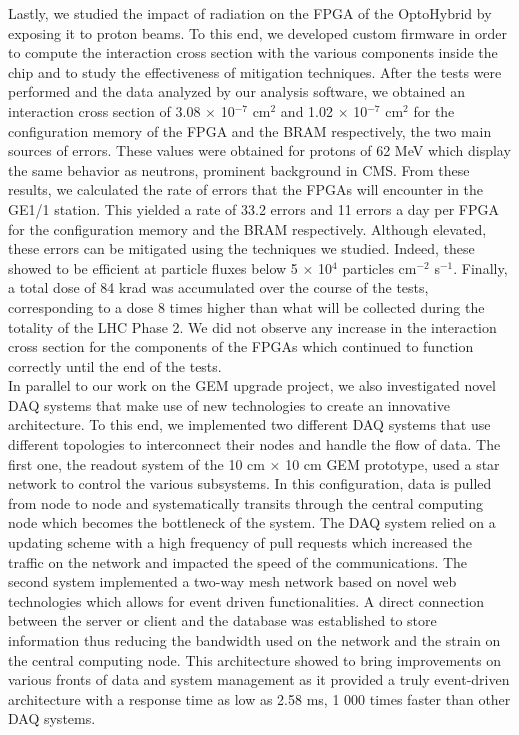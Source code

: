   Lastly, we studied the impact of radiation on the FPGA of the OptoHybrid by exposing it to proton beams. To this end, we developed custom firmware in order to compute the interaction cross section with the various components inside the chip and to study the effectiveness of mitigation techniques. After the tests were performed and the data analyzed by our analysis software, we obtained an interaction cross section of 3.08 $ \times $ 10$^{-7}$ cm$^{2}$ and 1.02 $ \times $ 10$^{-7}$ cm$^{2}$ for the configuration memory of the FPGA and the BRAM respectively, the two main sources of errors. These values were obtained for protons of 62 MeV which display the same behavior as neutrons, prominent background in CMS. From these results, we calculated the rate of errors that the FPGAs will encounter in the GE1/1 station. This yielded a rate of 33.2 errors and 11 errors a day per FPGA for the configuration memory and the BRAM respectively. Although elevated, these errors can be mitigated using the techniques we studied. Indeed, these showed to be efficient at particle fluxes below 5 $ \times $ 10$^4$ particles cm$^{-2}$ s$^{-1}$. Finally, a total dose of 84 krad was accumulated over the course of the tests, corresponding to a dose 8 times higher than what will be collected during the totality of the LHC Phase 2. We did not observe any increase in the interaction cross section for the components of the FPGAs which continued to function correctly until the end of the tests. \\

  In parallel to our work on the GEM upgrade project, we also investigated novel DAQ systems that make use of new technologies to create an innovative architecture. To this end, we implemented two different DAQ systems that use different topologies to interconnect their nodes and handle the flow of data. The first one, the readout system of the 10 cm $ \times $ 10 cm GEM prototype, used a star network to control the various subsystems. In this configuration, data is pulled from node to node and systematically transits through the central computing node which becomes the bottleneck of the system. The DAQ system relied on a updating scheme with a high frequency of pull requests which increased the traffic on the network and impacted the speed of the communications. The second system implemented a two-way mesh network based on novel web technologies which allows for event driven functionalities. A direct connection between the server or client and the database was established to store information thus reducing the bandwidth used on the network and the strain on the central computing node. This architecture showed to bring improvements on various fronts of data and system management as it provided a truly event-driven architecture with a response time as low as 2.58 ms, 1 000 times faster than other DAQ systems.
